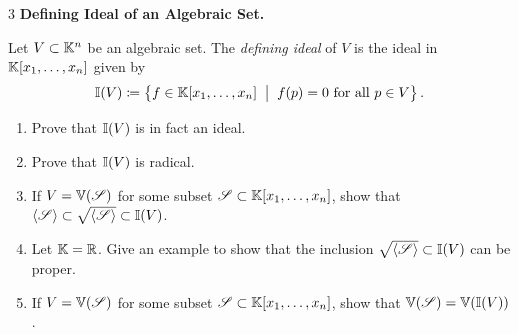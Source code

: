 \documentclass[Notebook.tex]{subfiles}
\begin{document}
\begin{problem}{3}
    \textbf{Defining Ideal of an Algebraic Set.} 
    
    Let $V \subset \mathbb K^n$ be an algebraic set. The \emph{defining ideal} of $V$ is the ideal in $\mathbb K[x_1,\ldots,x_n]$ given by 
    \[
    \mathbb I(V) \coloneqq \left\{ f \in \mathbb K[x_1,\ldots,x_n] \;\; \big| \;\; f(p) = 0 \text{ for all $p \in V$} \right\}.
    \]
    \begin{enumerate}[label=(\alph*),ref=\theenumi\alph*]
        \item Prove that $\mathbb I(V)$ is in fact an ideal. 
        \item Prove that $\mathbb I(V)$ is radical. 
        \item If $V = \mathbb V(\operatorname{\mathscr S})$ for some subset $\operatorname{\mathscr S} \subset \mathbb K[x_1,\ldots,x_n]$, show that $\langle \operatorname{\mathscr S} \rangle \subset \sqrt{\langle \operatorname{\mathscr S} \rangle} \subset \mathbb I(V)$. 
        \item\label{ex-pt:big-obstruction} Let $\mathbb K=\mathbb R$. Give an example to show that the inclusion $\sqrt{\langle \operatorname{\mathscr S} \rangle } \subset \mathbb I(V)$ can be proper. 
        \item If $V = \mathbb V(\operatorname{\mathscr S})$ for some subset $\operatorname{\mathscr S} \subset \mathbb K[x_1,\ldots,x_n]$, show that $\mathbb V(\operatorname{\mathscr S}) = \mathbb V(\mathbb I(V))$. 
    \end{enumerate}
\end{problem}
\end{document}
